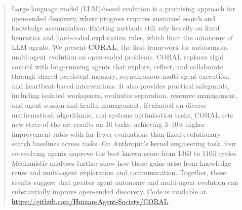 
\begin{abstract}

Large language model (LLM)-based evolution is a promising approach for open-ended discovery, where progress requires sustained search and knowledge accumulation. Existing methods still rely heavily on fixed heuristics and hard-coded exploration rules, which limit the autonomy of LLM agents. We present \textbf{CORAL}, the first framework for autonomous multi-agent evolution on open-ended problems. CORAL replaces rigid control with long-running agents that explore, reflect, and collaborate through shared persistent memory, asynchronous multi-agent execution, and heartbeat-based interventions. It also provides practical safeguards, including isolated workspaces, evaluator separation, resource management, and agent session and health management. Evaluated on diverse mathematical, algorithmic, and systems optimization tasks, CORAL sets new state-of-the-art results on 10 tasks, achieving 3--10$\times$ higher improvement rates with far fewer evaluations than fixed evolutionary search baselines across tasks. On Anthropic's kernel engineering task, four co-evolving agents improve the best known score from 1363 to 1103 cycles. Mechanistic analyses further show how these gains arise from knowledge reuse and multi-agent exploration and communication. Together, these results suggest that greater agent autonomy and multi-agent evolution can substantially improve open-ended discovery. Code is available at \url{https://github.com/Human-Agent-Society/CORAL}.

\end{abstract}